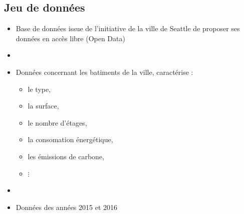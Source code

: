 \documentclass[8pt,aspectratio=169,hyperref={unicode=true}]{beamer}
\begin{document}
\subsection{Jeu de données}
\begin{frame}{\insertsubsection}
  \begin{itemize}
    \item Base de données issue de l'initiative de la ville de Seattle de proposer ses
          données en accès libre (Open Data)
    \item[]
    \item Données concernant les batiments de la ville, caractérise :
          \begin{itemize}
            \item le type,
            \item la surface,
            \item le nombre d'étages,
            \item la consomation énergétique,
            \item les émissions de carbone,
            \item $\vdots$
          \end{itemize}
    \item[]
    \item Données des années 2015 et 2016
  \end{itemize}
\end{frame}
\end{document}
